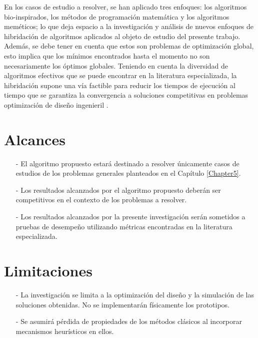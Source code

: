   En los casos de estudio a resolver, se han aplicado tres enfoques: los algoritmos bio-inspirados, los métodos de programación matemática y los algoritmos meméticos; lo que deja espacio a la investigación y análisis de nuevos enfoques de hibridación de algoritmos aplicados al objeto de estudio del presente trabajo. Además, se debe tener en cuenta que estos son problemas de optimización global, esto implica que los mínimos encontrados hasta el momento no son necesariamente los óptimos globales. Teniendo en cuenta la diversidad de algoritmos efectivos que se puede encontrar en la literatura especializada, la hibridación supone una vía factible para reducir los tiempos de ejecución al tiempo que se garantiza la convergencia a soluciones competitivas en problemas optimización de diseño ingenieril \cite{sacco_metropolis_2008} \cite{koch_hybridization_2009}  \cite{jovanovic_cuckoo_2016}.
  


  \section{Alcances}
  \begin{itemize}
  	\item[-] El algoritmo propuesto estará destinado a resolver únicamente casos de estudios de los problemas generales planteados en el Capítulo \ref{Chapter5}.
  	\item[-] Los resultados alcanzados por el algoritmo propuesto deberán ser competitivos en el contexto de los problemas a resolver.
  	\item [-] Los resultados alcanzados por la presente investigación serán sometidos a pruebas de desempeño utilizando métricas encontradas en la literatura especializada.
  	
  \end{itemize}
  
  \section{Limitaciones}
  \begin{itemize}
  	\item[-] La investigación se limita a la optimización del diseño y la simulación de las soluciones obtenidas. No se implementarán físicamente los prototipos.
  	\item[-] Se asumirá pérdida de propiedades de los métodos clásicos al incorporar mecanismos heurísticos en ellos. 
  	
  \end{itemize}

